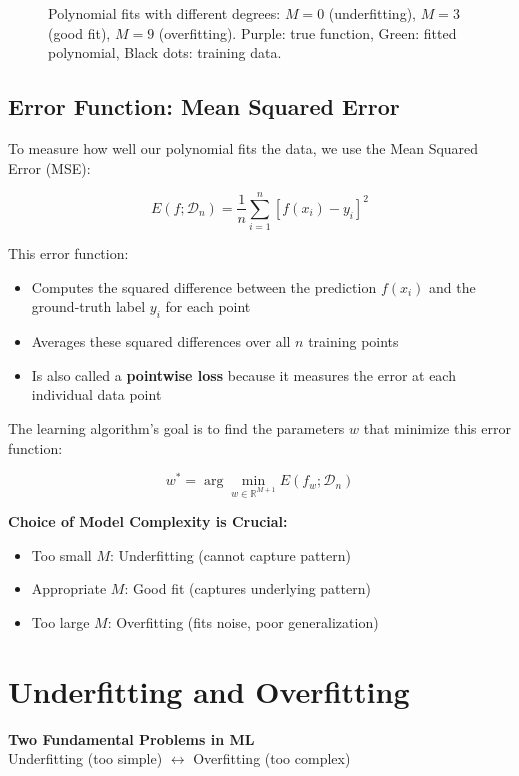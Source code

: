 \documentclass[11pt,a4paper]{article}
\theoremstyle{definition}
\theoremstyle{plain}
\theoremstyle{remark}
\begin{document}
\begin{figure}[h]
\begin{tikzpicture}
\end{tikzpicture}
\caption{Polynomial fits with different degrees: $M=0$ (underfitting), $M=3$ (good fit), $M=9$ (overfitting). Purple: true function, Green: fitted polynomial, Black dots: training data.}
\end{figure}

\subsection{Error Function: Mean Squared Error}

To measure how well our polynomial fits the data, we use the Mean Squared Error (MSE):

\[
E(f; \mathcal{D}_n) = \frac{1}{n} \sum_{i=1}^{n} [f(x_i) - y_i]^2
\]

This error function:
\begin{itemize}
    \item Computes the squared difference between the prediction $f(x_i)$ and the ground-truth label $y_i$ for each point
    \item Averages these squared differences over all $n$ training points
    \item Is also called a \textbf{pointwise loss} because it measures the error at each individual data point
\end{itemize}

The learning algorithm's goal is to find the parameters $w$ that minimize this error function:

\[
w^* = \arg\min_{w \in \mathbb{R}^{M+1}} E(f_w; \mathcal{D}_n)
\]

\begin{center}
\colorbox{cyan!10}{\parbox{0.9\textwidth}{
\textbf{Choice of Model Complexity is Crucial:}
\begin{itemize}
    \item Too small $M$: Underfitting (cannot capture pattern)
    \item Appropriate $M$: Good fit (captures underlying pattern)
    \item Too large $M$: Overfitting (fits noise, poor generalization)
\end{itemize}
}}
\end{center}

\section{Underfitting and Overfitting}

\begin{center}
\colorbox{purple!15}{\parbox{0.9\textwidth}{
\centering
\textbf{Two Fundamental Problems in ML}\\[0.2cm]
Underfitting (too simple) $\leftrightarrow$ Overfitting (too complex)
}}
\end{center}
\end{document}
